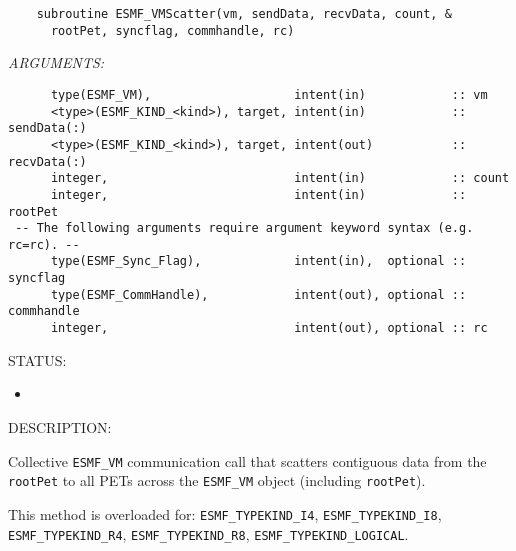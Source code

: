   
\begin{verbatim}    subroutine ESMF_VMScatter(vm, sendData, recvData, count, &
      rootPet, syncflag, commhandle, rc)\end{verbatim}{\em ARGUMENTS:}
\begin{verbatim}      type(ESMF_VM),                    intent(in)            :: vm
      <type>(ESMF_KIND_<kind>), target, intent(in)            :: sendData(:)
      <type>(ESMF_KIND_<kind>), target, intent(out)           :: recvData(:)
      integer,                          intent(in)            :: count
      integer,                          intent(in)            :: rootPet
 -- The following arguments require argument keyword syntax (e.g. rc=rc). --
      type(ESMF_Sync_Flag),             intent(in),  optional :: syncflag
      type(ESMF_CommHandle),            intent(out), optional :: commhandle
      integer,                          intent(out), optional :: rc\end{verbatim}
{\sf STATUS:}
   \begin{itemize}
   \item{}
   \end{itemize}
  
{\sf DESCRIPTION:\\ }


     Collective {\tt ESMF\_VM} communication call that scatters contiguous data 
     from the {\tt rootPet} to all PETs across the {\tt ESMF\_VM} object
     (including {\tt rootPet}).
  
     This method is overloaded for:
     {\tt ESMF\_TYPEKIND\_I4}, {\tt ESMF\_TYPEKIND\_I8},
     {\tt ESMF\_TYPEKIND\_R4}, {\tt ESMF\_TYPEKIND\_R8}, 
     {\tt ESMF\_TYPEKIND\_LOGICAL}.
  
